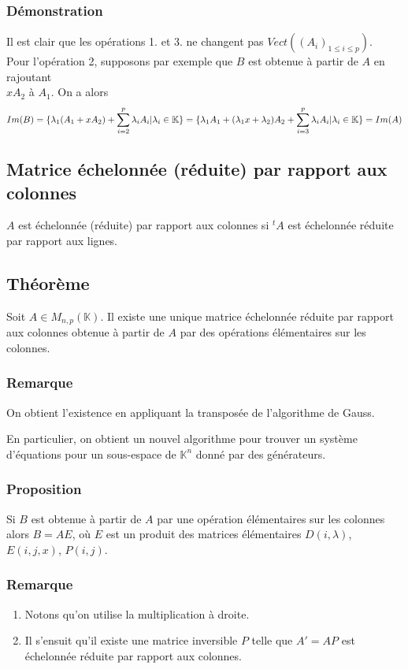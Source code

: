\documentclass[a4paper,10pt]{book} %
\newcommand{\K}{\mathbb{K}}
\begin{document}
\subsubsection{Démonstration}
Il est clair que les opérations 1. et 3. ne changent pas $Vect((A_i)_{1\leq i\leq p})$.\\

Pour l'opération 2, supposons par exemple que $B$ est obtenue à partir de $A$ en rajoutant\\
$xA_2$ à $A_1$. On a alors
$$Im(B)=\{\lambda_1(A_1+xA_2)+\sum\limits\limits_{i=2}^p\lambda_iA_i | \lambda_i\in\K \}
=\{\lambda_1A_1+(\lambda_1x+\lambda_2)A_2+\sum\limits\limits_{i=3}^p\lambda_iA_i | \lambda_i\in\K \}=Im(A)$$

\newpage

\subsection{Matrice échelonnée (réduite) par rapport aux colonnes}
$A$ est échelonnée (réduite) par rapport aux colonnes si ${}^tA$ est échelonnée réduite par rapport aux lignes.

\subsection{Théorème}
Soit $A \in M_{n,p}(\K)$. Il existe une unique matrice échelonnée réduite par rapport aux colonnes obtenue à partir de $A$ par des opérations élémentaires sur les colonnes.

\subsubsection{Remarque}
On obtient l'existence en appliquant la transposée de l'algorithme de Gauss.

En particulier, on obtient un nouvel algorithme pour trouver un système d'équations pour un sous-espace de $\K^n$ donné par des générateurs.

\subsubsection{Proposition}
Si $B$ est obtenue à partir de $A$ par une opération élémentaires sur les colonnes alors $B=AE$, où $E$ est un produit des matrices élémentaires $D(i,\lambda)$, $E(i,j,x)$, $P(i,j)$.

\subsubsection{Remarque}
\begin{enumerate}
\item Notons qu'on utilise la multiplication à droite.
\item Il s'ensuit qu'il existe une matrice inversible $P$ telle que $A'=AP$ est échelonnée réduite par rapport aux colonnes. \end{enumerate}
\end{document}
